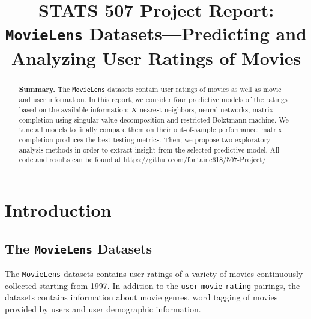 \documentclass[bj, preprint]{imsart}
\begin{document}
\begin{frontmatter}

\title{{\Large STATS 507 Project Report:} \\ 
\bf \texttt{MovieLens} Datasets---Predicting and Analyzing User Ratings of Movies}



\begin{abstract}
\textbf{Summary.} The \texttt{MovieLens} datasets contain user ratings of movies as well as movie and user information. In this report, we consider four predictive models of the ratings based on the available information: $K$-nearest-neighbors, neural networks, matrix completion using singular value decomposition and  restricted Bolztmann machine. We tune all models to finally compare them on their out-of-sample performance: matrix completion produces the best testing metrics. Then, we propose two exploratory analysis methods in order to extract insight from the selected predictive model. All code and results can be found at \url{https://github.com/fontaine618/507-Project/}.
\end{abstract}

\end{frontmatter}


\tableofcontents
\newpage
\section{Introduction}\label{sec:intro}
\subsection{The \texttt{MovieLens} Datasets}\label{subsec:dataset}

The \texttt{MovieLens} datasets \citep{harper2015MovieLensDatasetsHistory} contains user ratings of a variety of movies continuously collected starting from 1997. 
In addition to the \texttt{user}-\texttt{movie}-\texttt{rating} pairings, the datasets contains information about movie genres, word tagging of movies provided by users and user demographic information. 
\end{document}
